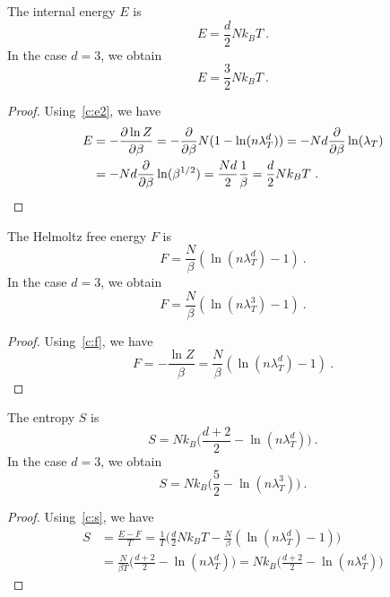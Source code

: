     The internal energy $E$ is 
    \begin{equation*}
        E = \frac{d}{2} N k_B T ~.
    \end{equation*}
    In the case $d=3$, we obtain 
    \begin{equation*}
        E = \frac{3}{2} N k_B T ~.
    \end{equation*}
    \begin{proof}
        Using~\eqref{c:e2}, we have
        \begin{equation*}
        \begin{aligned}
            E & = - \frac{\partial\ln Z}{\partial\beta}  = - \frac{\partial}{\partial\beta} N (1 - \ln (n \lambda_T^d)) = - Nd \frac{\partial}{\partial\beta} \ln (\lambda_T) \\ & = - Nd \frac{\partial}{\partial\beta} \ln (\beta^{1/2}) = \frac{Nd}{2} \frac{1}{\beta} = \frac{d}{2} N k_B T ~.
        \end{aligned}
        \end{equation*}
    \end{proof}
    The Helmoltz free energy $F$ is 
    \begin{equation*}
        F = \frac{N}{\beta} (\ln (n \lambda_T^d) - 1) ~.
    \end{equation*}
    In the case $d=3$, we obtain 
    \begin{equation*}
        F = \frac{N}{\beta} (\ln (n \lambda_T^3) - 1) ~.
    \end{equation*}
    \begin{proof}
        Using~\eqref{c:f}, we have
        \begin{equation*}
            F = - \frac{\ln Z}{\beta} = \frac{N}{\beta} (\ln (n \lambda_T^d) - 1) ~.
        \end{equation*}
    \end{proof}
    The entropy $S$ is 
    \begin{equation*}
        S = N k_B \Big ( \frac{d+2}{2} - \ln (n \lambda_T^d) \Big ) ~.
    \end{equation*}
    In the case $d=3$, we obtain 
    \begin{equation*}
        S = N k_B \Big ( \frac{5}{2} - \ln (n \lambda_T^3) \Big ) ~.
    \end{equation*}
    \begin{proof}
        Using~\eqref{c:s}, we have
        \begin{equation*}
        \begin{aligned}
            S & = \frac{E - F}{T} = \frac{1}{T} \Big ( \frac{d}{2} N k_B T - \frac{N}{\beta} (\ln (n \lambda_T^d) - 1) \Big ) \\ & = \frac{N}{\beta T} \Big ( \frac{d+2}{2} - \ln (n \lambda_T^d) \Big )  = N k_B \Big ( \frac{d+2}{2} - \ln (n \lambda_T^d) \Big )
        \end{aligned}
        \end{equation*}
    \end{proof}
